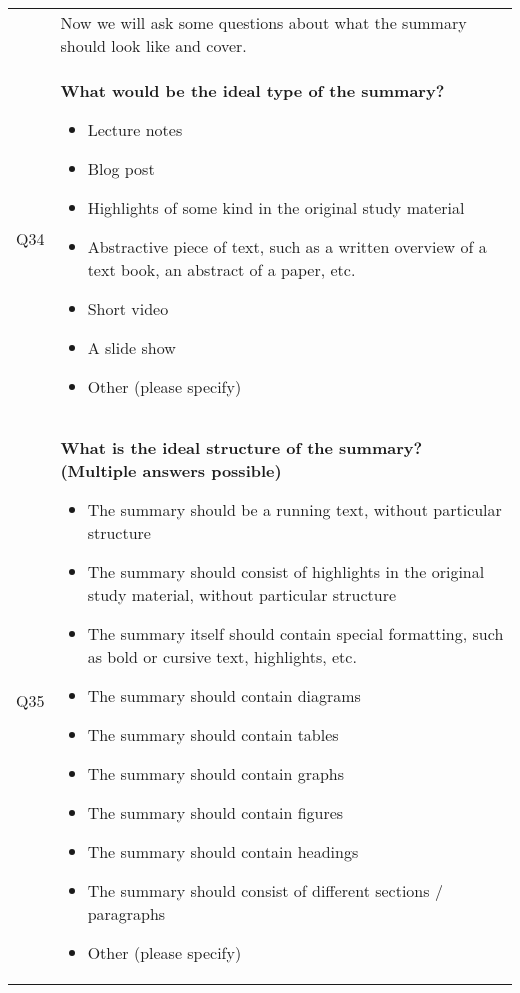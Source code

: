 \begin{xtabular}{@{\,}l <{\hskip 2pt} >{\raggedright\arraybackslash}p{0.82\textwidth}}
        \\

        & Now we will ask some questions about what the summary should look like and cover. \\

        Q34 & \textbf{What would be the ideal type of the summary?}
        \begin{itemize}[label=$\square$, leftmargin=*, nosep]
          \item Lecture notes
          \item Blog post
          \item Highlights of some kind in the original study material
          \item Abstractive piece of text, such as a written overview of a text book, an abstract of a paper, etc.
          \item Short video
          \item A slide show
          \item Other (please specify)
        \end{itemize}

        \\

        Q35 & \textbf{What is the ideal structure of the summary? (Multiple answers possible)}
        \begin{itemize}[label=$\square$, leftmargin=*, nosep]
          \item The summary should be a running text, without particular structure
          \item The summary should consist of highlights in the original study material, without particular structure
          \item The summary itself should contain special formatting, such as bold or cursive text, highlights, etc.
          \item The summary should contain diagrams
          \item The summary should contain tables
          \item The summary should contain graphs
          \item The summary should contain figures
          \item The summary should contain headings
          \item The summary should consist of different sections / paragraphs
          \item Other (please specify)
        \end{itemize}


\end{xtabular}
